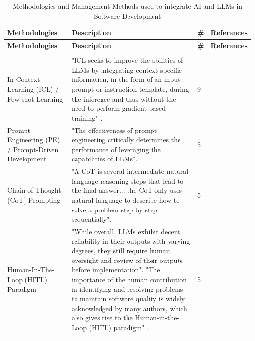 {\small
\begin{longtable}{>{\raggedright\arraybackslash} p{3cm} p{9.3cm} p{0.2cm} p{1.8cm}}
\caption{Methodologies and Management Methods used to integrate AI and LLMs in Software Development}
\label{tab:methodologies} \\

\toprule
\textbf{Methodologies} & \textbf{Description} & \textbf{\#} & \textbf{References}\\
\midrule
\endfirsthead

\toprule
\textbf{Methodologies} & \textbf{Description} & \textbf{\#} & \textbf{References}\\
\midrule
\endhead

\midrule
\multicolumn{4}{r}{\textit{Continued on next page}}\\
\bottomrule
\endfoot

\bottomrule
\endlastfoot

In-Context Learning (ICL) / Few-shot Learning & "ICL seeks to improve the abilities of LLMs by integrating context-specific information, in the form of an input prompt or instruction template, during the inference and thus without the need to perform gradient-based training" \cite{Weyssow:2025ep}. & 9 & \cite{Weyssow:2025ep, Terragni:2025fa, Chen:2025es, Ramos:2025aa, Durrani:2024ad, Gao:2025cc, Hemmat:2025rd, Qiu:2025ft, Jabrw:2025ss} \\ \addlinespace

Prompt Engineering (PE) / Prompt-Driven Development & "The effectiveness of prompt engineering critically determines the performance of leveraging the capabilities of LLMs". \cite{Jabrw:2025ss} & 5 &  \cite{Jabrw:2025ss, Pendyala:2025pi, Qiu:2025ft, Ahmed:2025ai, Chen:2025es} \\ \addlinespace

Chain-of-Thought (CoT) Prompting & "A CoT is several intermediate natural language reasoning steps that lead to the final answer... the CoT only uses natural language to describe how to solve a problem step by step sequentially". \cite{Li:2025sc} & 5 & \cite{Li:2025sc, Jabrw:2025ss, Chen:2025es, Ahmed:2025ai , Gao:2025cc} \\ \addlinespace

Human-In-The-Loop (HITL) Paradigm & "While overall, LLMs exhibit decent reliability in their outputs with varying degrees, they still require human oversight and review of their outputs before implementation". "The importance of the human contribution in identifying and resolving problems to maintain software quality is widely acknowledged by many authors, which also gives rise to the Human-in-the-Loop (HITL) paradigm" \cite{Kim:2025ao}. & 5 & \cite{Kim:2025ao, Wang:2025rs, Terragni:2025fa, Hemmat:2025rd, Haque:2025la}\\ \addlinespace


\end{longtable}}
